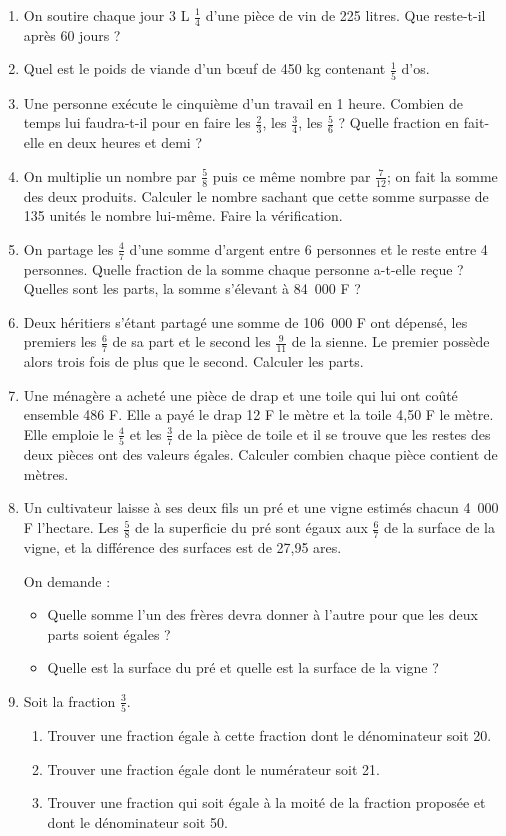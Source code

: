 \begin{enumerate}
\item On soutire chaque jour 3 L $\frac14$ d'une pièce de vin de 225 litres. Que reste-t-il après 60 jours ?
\item Quel est le poids de viande d'un bœuf de 450 kg contenant $\frac15$ d'os. 
\item Une personne exécute le cinquième d'un travail en 1 heure. Combien de temps lui faudra-t-il pour en 
faire les $\frac23$, les $\frac34$, les $\frac56$ ?
Quelle fraction en fait-elle en deux heures et demi ? 
\item On multiplie un nombre par $\frac58$ puis ce même nombre par $\frac7{12}$; on fait la somme des deux produits. Calculer le nombre sachant que cette somme surpasse de 135 unités le nombre lui-même. Faire la vérification. 
\item On partage les $\frac47$ d'une somme d'argent entre 6 personnes et le reste entre 4 personnes. 
Quelle fraction de la somme chaque personne a-t-elle 
reçue ? Quelles sont les parts, la somme s'élevant à 84~000 F ? 
\item Deux héritiers s'étant partagé une somme de 106~000 F ont dépensé, les premiers les $\frac67$ de sa part et le second les $\frac9{11}$ de la sienne. Le premier possède alors trois fois de plus que le second. Calculer les parts. 
\item Une ménagère a acheté une pièce de drap et une toile qui lui ont coûté ensemble 486 F. Elle a payé le drap 12 F le mètre et la toile 4,50 F le mètre. Elle emploie le $\frac45$ et les $\frac37$ de la pièce de toile et il se trouve que les restes des deux pièces ont des valeurs égales. Calculer combien chaque pièce contient de mètres. 
\item Un cultivateur laisse à ses deux fils un pré et une vigne estimés chacun 4~000 F l'hectare. Les $\frac58$ de la superficie du pré sont égaux aux $\frac67$ de la surface de la vigne, et la différence des surfaces est de 27,95 ares. 

On demande : \begin{itemize}
\item Quelle somme l'un des frères devra donner à l'autre pour que les deux parts soient égales ? 
\item Quelle est la surface du pré et quelle est la surface de la vigne ? 
\end{itemize}
\item Soit la fraction $\frac35$. 
\begin{enumerate}
\item Trouver une fraction égale à cette fraction dont le dénominateur soit 20. 
\item Trouver une fraction égale dont le numérateur soit 21. 
\item Trouver une fraction qui soit égale à la moité de la fraction proposée et dont le dénominateur soit 50. 
\end{enumerate} 
 \end{enumerate}
 
